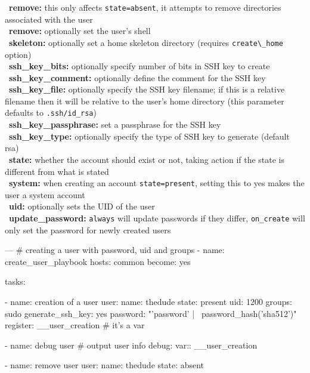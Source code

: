 \documentclass{refcard}
\begin{document}
\textbullet\ \textbf{remove:} this only affects \verb|state=absent|, it attempts to remove directories associated with the user\\
\textbullet\ \textbf{remove:} optionally set the user's shell\\
\textbullet\ \textbf{skeleton:} optionally set a home skeleton directory (requires \verb|create\_home| option)\\
\textbullet\ \textbf{ssh\_key\_bits:} optionally specify number of bits in SSH key to create\\
\textbullet\ \textbf{ssh\_key\_comment:} optionally define the comment for the SSH key\\
\textbullet\ \textbf{ssh\_key\_file:} optionally specify the SSH key filename; if this is a relative filename then it will be relative to the user's home directory (this parameter defaults to \verb|.ssh/id_rsa|)\\
\textbullet\ \textbf{ssh\_key\_passphrase:} set a passphrase for the SSH key\\
\textbullet\ \textbf{ssh\_key\_type:} optionally specify the type of SSH key to generate (default rsa)\\
\textbullet\ \textbf{state:} whether the account should exist or not, taking action if the state is different from what is stated\\
\textbullet\ \textbf{system:} when creating an account \verb|state=present|, setting this to yes makes the user a system account\\
\textbullet\ \textbf{uid:} optionally sets the UID of the user\\
\textbullet\ \textbf{update\_password:} \verb|always| will update passwords if they differ, \verb|on_create| will only set the password for newly created users\\

\begin{yamlbox}
---
# creating a user with password, uid and groups
- name: create_user_playbook
  hosts: common
  become: yes
  
  tasks:
  
  - name: creation of a user
    user:
      name: thedude
      state: present
      uid: 1200
      groups: sudo
      generate_ssh_key: yes
      password: "{{'password' | \
          password_hash('sha512')}}"
    register: __user_creation # it's a var
  
  - name: debug user # output user info
    debug:
      var:: __user_creation
  
  - name: remove user
    user:
      name: thedude
      state: absent
\end{yamlbox}
\end{document}
